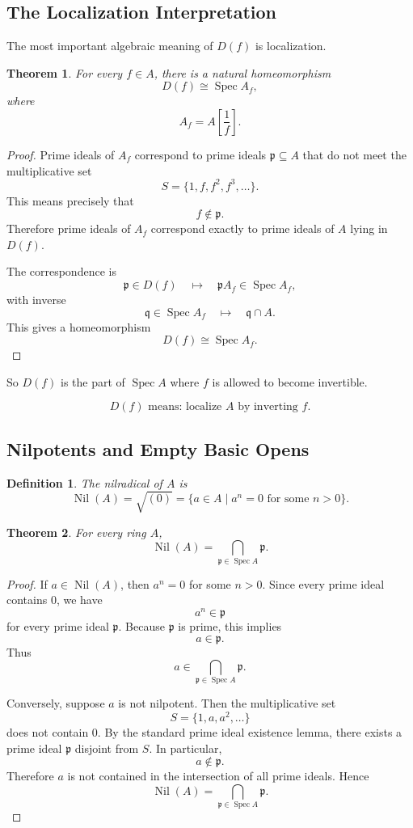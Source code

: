 \documentclass[12pt,a4paper]{article}
\newtheorem{theorem}{Theorem}[section]
\newtheorem{definition}{Definition}[section]
\newcommand{\Spec}{\operatorname{Spec}}
\newcommand{\Nil}{\operatorname{Nil}}
\newcommand{\mfp}{\mathfrak p}
\begin{document}
\subsection{The Localization Interpretation}

The most important algebraic meaning of \(D(f)\) is localization.

\begin{theorem}
	For every \(f\in A\), there is a natural homeomorphism
	\[
	D(f)\cong \Spec A_f,
	\]
	where
	\[
	A_f=A\left[\frac{1}{f}\right].
	\]
\end{theorem}

\begin{proof}
	Prime ideals of \(A_f\) correspond to prime ideals \(\mfp\subseteq A\) that do
	not meet the multiplicative set
	\[
	S=\{1,f,f^2,f^3,\dots\}.
	\]
	This means precisely that
	\[
	f\notin\mfp.
	\]
	Therefore prime ideals of \(A_f\) correspond exactly to prime ideals of \(A\)
	lying in \(D(f)\).
	
	The correspondence is
	\[
	\mfp\in D(f)
	\quad\longmapsto\quad
	\mfp A_f\in\Spec A_f,
	\]
	with inverse
	\[
	\mathfrak q\in\Spec A_f
	\quad\longmapsto\quad
	\mathfrak q\cap A.
	\]
	This gives a homeomorphism
	\[
	D(f)\cong \Spec A_f.
	\]
\end{proof}

So \(D(f)\) is the part of \(\Spec A\) where \(f\) is allowed to become
invertible.

\[
\boxed{
	D(f)\text{ means: localize }A\text{ by inverting }f.
}
\]

\subsection{Nilpotents and Empty Basic Opens}

\begin{definition}
	The nilradical of \(A\) is
	\[
	\Nil(A)=\sqrt{(0)}
	=
	\{a\in A\mid a^n=0\text{ for some }n>0\}.
	\]
\end{definition}

\begin{theorem}
	For every ring \(A\),
	\[
	\Nil(A)=\bigcap_{\mfp\in\Spec A}\mfp.
	\]
\end{theorem}

\begin{proof}
	If \(a\in\Nil(A)\), then \(a^n=0\) for some \(n>0\). Since every prime ideal
	contains \(0\), we have
	\[
	a^n\in\mfp
	\]
	for every prime ideal \(\mfp\). Because \(\mfp\) is prime, this implies
	\[
	a\in\mfp.
	\]
	Thus
	\[
	a\in\bigcap_{\mfp\in\Spec A}\mfp.
	\]
	
	Conversely, suppose \(a\) is not nilpotent. Then the multiplicative set
	\[
	S=\{1,a,a^2,\dots\}
	\]
	does not contain \(0\). By the standard prime ideal existence lemma, there
	exists a prime ideal \(\mfp\) disjoint from \(S\). In particular,
	\[
	a\notin\mfp.
	\]
	Therefore \(a\) is not contained in the intersection of all prime ideals.
	Hence
	\[
	\Nil(A)=\bigcap_{\mfp\in\Spec A}\mfp.
	\]
\end{proof}
\end{document}
